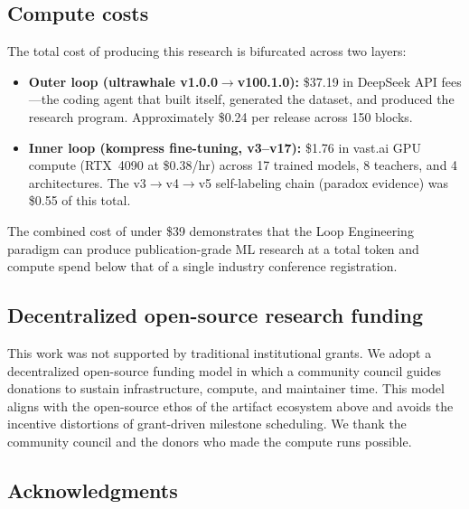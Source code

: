 \subsection{Compute costs}

The total cost of producing this research is bifurcated across two layers:

\begin{itemize}
  \item \textbf{Outer loop (ultrawhale v1.0.0$\to$v100.1.0):} \$37.19 in
        DeepSeek API fees---the coding agent that built itself, generated the
        dataset, and produced the research program. Approximately \$0.24 per
        release across 150 blocks.
  \item \textbf{Inner loop (kompress fine-tuning, v3--v17):} \$1.76 in
        vast.ai GPU compute (RTX~4090 at \$0.38/hr) across 17 trained models,
        8 teachers, and 4 architectures. The v3$\to$v4$\to$v5
        self-labeling chain (paradox evidence) was \$0.55 of this total.
\end{itemize}

The combined cost of under \$39 demonstrates that the Loop Engineering
paradigm can produce publication-grade ML research at a total token and
compute spend below that of a single industry conference registration.

\subsection{Decentralized open-source research funding}

This work was not supported by traditional institutional grants. We adopt a
decentralized open-source funding model in which a community council guides
donations to sustain infrastructure, compute, and maintainer time. This model
aligns with the open-source ethos of the artifact ecosystem above and avoids
the incentive distortions of grant-driven milestone scheduling. We thank the
community council and the donors who made the compute runs possible.

\subsection{Acknowledgments}

